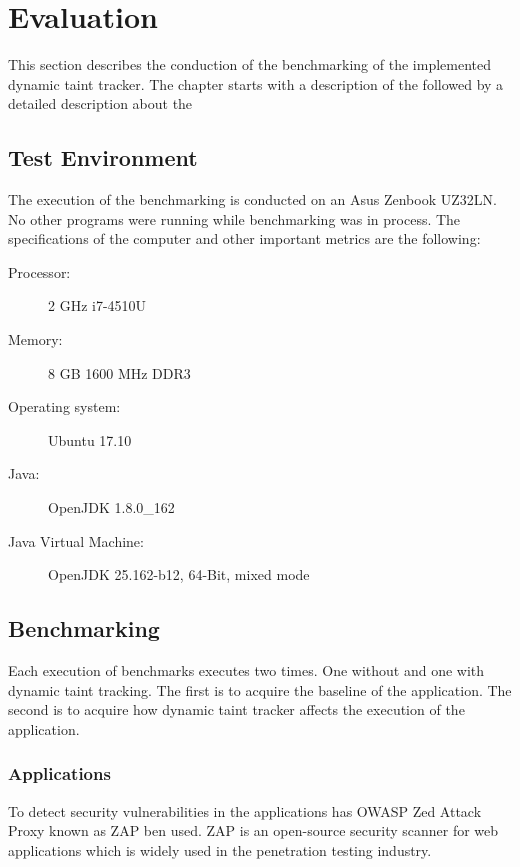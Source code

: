 \chapter{Evaluation}
\label{Evaluation}

This section describes the conduction of the benchmarking of the implemented dynamic taint tracker. The chapter starts with a description of the \textit{} followed by a detailed description about the \textit{}



\section{Test Environment}
\label{TestEnvironment}
The execution of the benchmarking is conducted on an Asus Zenbook UZ32LN. No other programs were running while benchmarking was in process. The specifications of the computer and other important metrics are the following:

\begin{description}
    \item [Processor:] 2 GHz i7-4510U
    \item [Memory:] 8 GB 1600 MHz DDR3
    \item [Operating system:] Ubuntu 17.10
    \item [Java:] OpenJDK 1.8.0\_162
    \item [Java Virtual Machine:] OpenJDK 25.162-b12, 64-Bit, mixed mode
\end{description}



\section{Benchmarking}
\label{Benchmarking}
Each execution of benchmarks executes two times. One without and one with dynamic taint tracking. The first is to acquire the baseline of the application. The second is to acquire how dynamic taint tracker affects the execution of the application.



\subsection{Applications}
To detect security vulnerabilities in the applications has OWASP Zed Attack Proxy \parencite{zap} known as ZAP ben used. ZAP is an open-source security scanner for web applications which is widely used in the penetration testing industry.


